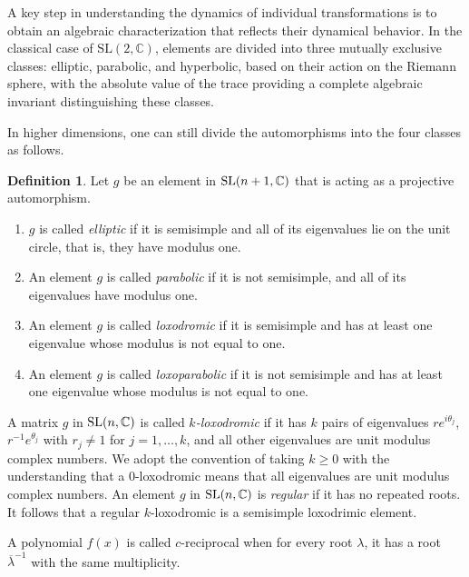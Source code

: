 \documentclass[11pt]{amsart}
\numberwithin{equation}{section}
\theoremstyle{plain}
\theoremstyle{definition}
\newtheorem{defn}[theorem]{Definition}
\newcommand{\C}{\mathbb{C}}
\numberwithin{equation}{section}
\def \SL{ {\rm SL}}
\begin{document}
A key step in understanding the dynamics of individual transformations is to obtain an algebraic characterization that reflects their dynamical behavior. In the classical case of $\mathrm{SL}(2, \mathbb{C})$, elements are divided into three mutually exclusive classes:  elliptic, parabolic, and hyperbolic, based on their action on the Riemann sphere, with the absolute value of the trace providing a complete algebraic invariant distinguishing these classes.

In higher dimensions, one can still divide the automorphisms into the four classes as follows. 

\begin{defn}	\label{def:classification}
		Let $g$ be an element in $\SL(n+1, \C)$ that is acting as a projective automorphism. 
		\begin{enumerate}

        
			\item $g$ is called \emph{elliptic} if it is semisimple and all of its eigenvalues lie on the unit circle, that is, they have modulus one.

            \item An element \( g \) is called \emph{parabolic} if it is not semisimple, and all of its eigenvalues have modulus one.

\item An element \( g \) is called \emph{loxodromic} if it is semisimple and has at least one eigenvalue whose modulus is not equal to one.

\item An element \( g \) is called \emph{loxoparabolic} if it is not semisimple and has at least one eigenvalue whose modulus is not equal to one.
\end{enumerate}
        \end{defn}

        A matrix $g$ in $\SL(n, \C)$ is called \emph{$k$-loxodromic} if it has $k$ pairs of eigenvalues $re^{i \theta_j}$, $r^{-1}e^{ \theta_j}$ with $r_j \neq 1$ for $j=1, \ldots, k$, and all other eigenvalues are unit modulus complex numbers. We adopt the
convention of taking $k\geq 0$ with the understanding that a $0$-loxodromic means that
all eigenvalues are unit modulus complex numbers. An element $g$ in $\SL(n, \C)$ is \emph{regular} if it has no repeated roots. It follows that a regular $k$-loxodromic is a semisimple loxodrimic element. 

A polynomial $f(x)$ is called $c$-reciprocal when for every root  $\lambda$, it has a root $\overline \lambda^{-1}$ with the same multiplicity. 
\end{document}
